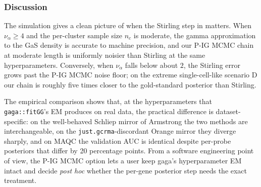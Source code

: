 \subsubsection{Discussion}

The simulation gives a clean picture of when the Stirling step in
\citet{Rossell2009GaGa} matters. When $\nu_\alpha \ge 4$ and the
per-cluster sample size $n_c$ is moderate, the gamma approximation to
the GaS density is accurate to machine precision, and our P-IG MCMC
chain at moderate length is uniformly noisier than Stirling at the
same hyperparameters. Conversely, when $\nu_\alpha$ falls below
about $2$, the Stirling error grows past the P-IG MCMC noise floor;
on the extreme single-cell-like scenario D our chain is roughly
five times closer to the gold-standard posterior than Stirling.

The empirical comparison shows that, at the hyperparameters that
\texttt{gaga::fitGG}'s EM produces on real data, the practical
difference is dataset-specific: on the well-behaved Schliep mirror
of Armstrong the two methods are interchangeable, on the
\texttt{just.gcrma}-discordant Orange mirror they diverge sharply,
and on MAQC the validation AUC is identical despite per-probe
posteriors that differ by 20 percentage points. From a software
engineering point of view, the P-IG MCMC option lets a user keep
gaga's hyperparameter EM intact and decide \emph{post hoc} whether
the per-gene posterior step needs the exact treatment.

